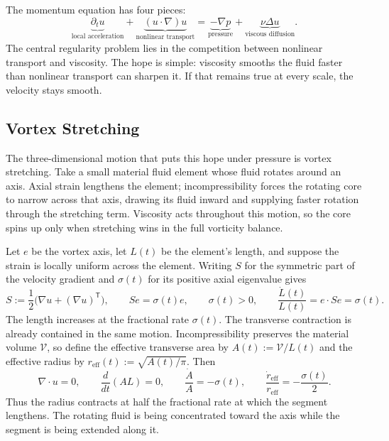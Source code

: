 
The momentum equation has four pieces:
\[
  \underbrace{\partial_t u}_{\text{local acceleration}}
  +
  \underbrace{(u\cdot\nabla)u}_{\text{nonlinear transport}}
  =
  \underbrace{-\nabla p}_{\text{pressure}}
  +
  \underbrace{\nu\Delta u}_{\text{viscous diffusion}}.
\]
The central regularity problem lies in the competition between nonlinear transport and viscosity.
The hope is simple: viscosity smooths the fluid faster than nonlinear transport can sharpen it.
If that remains true at every scale, the velocity stays smooth.

\subsection{Vortex Stretching}\label{sub:ThePerfectlyStretchingVortex}

The three-dimensional motion that puts this hope under pressure is vortex stretching. Take a small material fluid element whose fluid rotates around an axis. Axial strain lengthens the element; incompressibility forces the rotating core to narrow across that axis, drawing its fluid inward and supplying faster rotation through the stretching term. Viscosity acts throughout this motion, so the core spins up only when stretching wins in the full vorticity balance.

Let \(e\) be the vortex axis, let \(L(t)\) be the element's length, and suppose the strain is locally uniform across the element. Writing \(S\) for the symmetric part of the velocity gradient and \(\sigma(t)\) for its positive axial eigenvalue gives
\[
  S:=\frac12\bigl(\nabla u+(\nabla u)^{\mathsf T}\bigr),
  \qquad
  Se=\sigma(t)e,
  \qquad
  \sigma(t)>0,
  \qquad
  \frac{\dot L(t)}{L(t)}
  =
  e\cdot Se
  =
  \sigma(t).
\]
The length increases at the fractional rate \(\sigma(t)\). The transverse contraction is already contained in the same motion. Incompressibility preserves the material volume \(\mathcal V\), so define the effective transverse area by \(A(t):=\mathcal V/L(t)\) and the effective radius by \(r_{\mathrm{eff}}(t):=\sqrt{A(t)/\pi}\). Then
\[
  \nabla\cdot u=0,
  \qquad
  \frac{d}{dt}(A L)=0,
  \qquad
  \frac{\dot A}{A}=-\sigma(t),
  \qquad
  \frac{\dot r_{\mathrm{eff}}}{r_{\mathrm{eff}}}
  =
  -\frac{\sigma(t)}{2}.
\]
Thus the radius contracts at half the fractional rate at which the segment lengthens. The rotating fluid is being concentrated toward the axis while the segment is being extended along it.

